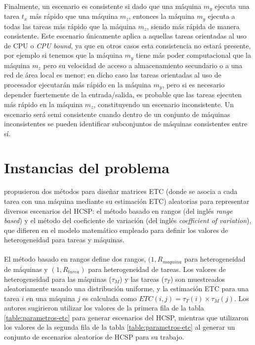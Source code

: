\paragraph{}Finalmente, un escenario es consistente si dado que una máquina $m_y$ ejecuta una tarea $t_x$ más rápido que una máquina $m_z$, entonces la máquina $m_y$ ejecuta a todas las tareas más rápido que la máquina $m_z$, siendo más rápida de manera consistente. Este escenario únicamente aplica a aquellas tareas orientadas al uso de CPU o \textit{CPU bound}, ya que en otros casos esta consistencia no estará presente, por ejemplo si tenemos que la máquina $m_y$ tiene más poder computacional que la máquina $m_z$ pero su velocidad de acceso a almacenamiento secundario o a una red de área local es menor; en dicho caso las tareas orientadas al uso de procesador ejecutarán más rápido en la máquina $m_y$, pero si es necesario depender fuertemente de la entrada/salida, es probable que las tareas ejecuten más rápido en la máquina $m_z$, constituyendo un escenario inconsistente. Un escenario será semi consistente cuando dentro de un conjunto de máquinas inconsistentes se pueden identificar subconjuntos de máquinas consistentes entre sí.

\section{Instancias del problema} \label{section:descripcion-problema,subsection:instancias-del-problema}

\paragraph{}\citet{bib-ali-hc-etc} propusieron dos métodos para diseñar matrices ETC (donde se asocia a cada tarea con una máquina mediante su estimación ETC) aleatorias para representar diversos escenarios del HCSP: el método basado en rangos (del inglés \textit{range based}) y el método del coeficiente de variación (del inglés \textit{coefficient of variation}), que difieren en el modelo matemático empleado para definir los valores de heterogeneidad para tareas y máquinas.

\paragraph{}El método basado en rangos define dos rangos, $(1, R_{maquina}$ para heterogeneidad de máquinas y $(1, R_{tarea})$ para heterogeneidad de tareas. Los valores de heterogeneidad para las máquinas ($\tau_{M}$) y las tareas ($\tau_{T}$) son muestreados aleatoriamente usando una distribución uniforme, y la estimación ETC para una tarea $i$ en una máquina $j$ es calculada como $ETC(i,j) = \tau_{T}(i) \times \tau_{M}(j)$. Los autores sugirieron utilizar los valores de la primera fila de la tabla \ref{table:parametros-etc} para generar escenarios del HCSP, mientras que \citet{bib-braun} utilizaron los valores de la segunda fila de la tabla \ref{table:parametros-etc} al generar un conjunto de escenarios aleatorios de HCSP para su trabajo.

